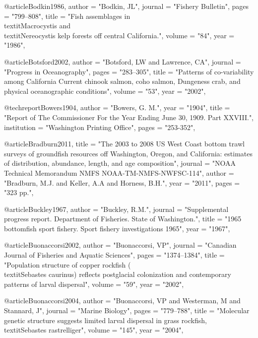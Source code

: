 @article{Bodkin1986,
    author = "{Bodkin, JL}",
    journal = "{Fishery Bulletin}",
    pages = "{799--808}",
    title = "{{Fish assemblages in \\textit{Macrocystis} and \\textit{Nereocystis} kelp forests off central California.}}",
    volume = "{84}",
    year = "{1986}",
}

@article{Botsford2002,
    author = "{Botsford, LW and Lawrence, CA}",
    journal = "{Progress in Oceanography}",
    pages = "{283--305}",
    title = "{{Patterns of co-variability among California Current chinook salmon, coho salmon, Dungeness crab, and physical oceanographic conditions}}",
    volume = "{53}",
    year = "{2002}",
}

@techreport{Bowers1904,
    author = "{Bowers, G. M.}",
    year = "{1904}",
    title = "{Report of The Commissioner For the Year Ending June 30, 1909. Part XXVIII.}",
    institution = "{Washington Printing Office}",
    pages = "{253-352}",
}

@article{Bradburn2011,
    title = "{The 2003 to 2008 {US} {West} {Coast} bottom trawl surveys of groundfish resources off {Washington}, {Oregon}, and {California}: estimates of distribution, abundance, length, and age composition}",
    journal = "{NOAA Technical Memorandum NMFS NOAA-TM-NMFS-NWFSC-114}",
    author = "{Bradburn, M.J. and Keller, A.A and Horness, B.H.}",
    year = "{2011}",
    pages = "{323 pp.}",
}

@article{Buckley1967,
    author = "{Buckley, R.M.}",
    journal = "{Supplemental progress report. Department of Fisheries. State of Washington.}",
    title = "{{1965 bottomfish sport fishery. Sport fishery investigations 1965}}",
    year = "{1967}",
}

@article{Buonaccorsi2002,
    author = "{Buonaccorsi, VP}",
    journal = "{Canadian Journal of Fisheries and Aquatic Sciences}",
    pages = "{1374--1384}",
    title = "{{Population structure of copper rockfish (\\textit{{Sebastes} caurinus}) reflects postglacial colonization and contemporary patterns of larval dispersal}}",
    volume = "{59}",
    year = "{2002}",
}

@article{Buonaccorsi2004,
    author = "{Buonaccorsi, VP and Westerman, M and Stannard, J}",
    journal = "{Marine Biology}",
    pages = "{779--788}",
    title = "{{Molecular genetic structure suggests limited larval dispersal in grass rockfish, \\textit{{Sebastes} rastrelliger}}}",
    volume = "{145}",
    year = "{2004}",
}

